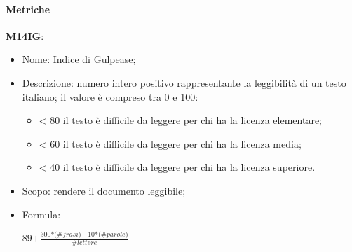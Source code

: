 \paragraph{Metriche}
\textbf{M14IG}:
    \begin{itemize}
      \item Nome: Indice di Gulpease;
      \item Descrizione: numero intero positivo rappresentante la leggibilità di un testo italiano; il valore è compreso tra 0 e 100:
           \begin{itemize}
                \item < 80 il testo è difficile da leggere per chi ha la licenza elementare;
                \item < 60 il testo è difficile da leggere per chi ha la licenza media;
                \item < 40 il testo è difficile da leggere per chi ha la licenza superiore.
           \end{itemize}
      \item Scopo: rendere il documento leggibile;
      \item Formula:
      \begin{center}
        $ \textit{89+}\frac{\textit{300*(\#frasi) - 10*(\#parole)}}{\textit{\#lettere}}$
      \end{center}
\end{itemize}